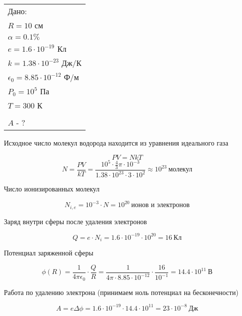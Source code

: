 \solutionSection

\begin{tabular}{l|}
    Дано: \\
    $R = 10$ см \\
    $\alpha = 0.1\%$ \\
    $e = 1.6 \cdot 10^{-19}$ Кл \\
    $k = 1.38 \cdot 10^{-23}$ Дж/К \\
    $\epsilon_0 = 8.85 \cdot 10^{-12}$ Ф/м \\
    $P_0 = 10^5$ Па \\
    $T= 300$ К \\
    \hline \\
    $A$ - ?
\end{tabular}

Исходное число молекул водорода находится из уравнения идеального газа

$$PV = NkT$$
$$N = \frac{PV}{kT} = \frac{10^5 \cdot \frac{4}{3} \pi \cdot 10^{-3}}{1.38 \cdot 10^{23} \cdot 3 \cdot 10^2} \approx 10^{23} \: \text{молекул}$$

Число ионизированных молекул

$$N_{i, e} = 10^{-3} \cdot N = 10^{20} \: \text{ионов и электронов}$$

Заряд внутри сферы после удаления электронов

$$Q = e \cdot N_i = 1.6 \cdot 10^{-19} \cdot 10^{20} = 16 \: \text{Кл}$$

Потенциал заряженной сферы

$$\phi(R) = \frac{1}{4 \pi \epsilon_0} \cdot \frac{Q}{R} = \frac{1}{4\pi \cdot 8.85 \cdot 10^{-12}} \cdot \frac{16}{10^{-1}} = 14.4 \cdot 10^{11} \: \text{В}$$

Работа по удалению электрона (принимаем ноль потенциал на бесконечности)

$$A = e \Delta \phi = 1.6 \cdot 10^{-19} \cdot 14.4 \cdot 10^{11} = 23 \cdot 10^{-8} \: \text{Дж}$$


